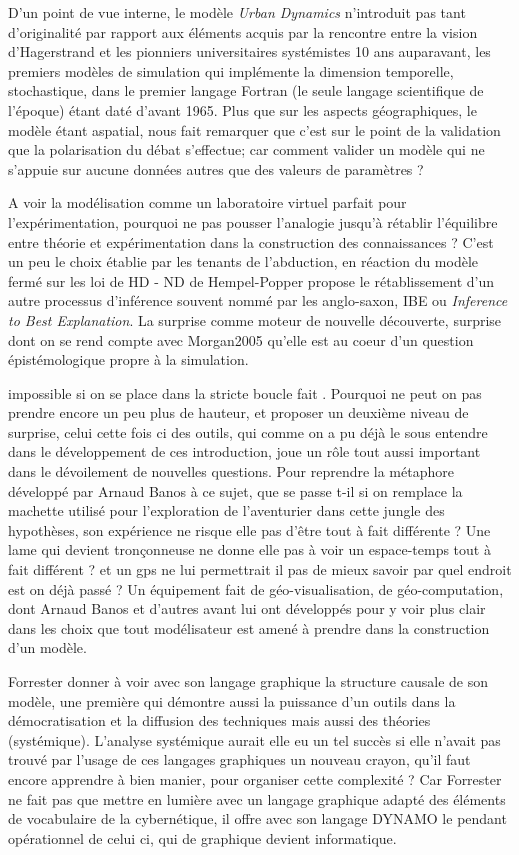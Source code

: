 D'un point de vue interne, le modèle \textit{Urban Dynamics} n'introduit pas tant d'originalité par rapport aux éléments acquis par la rencontre entre la vision d'Hagerstrand et les pionniers universitaires systémistes 10 ans auparavant, les premiers modèles de simulation qui implémente la dimension temporelle, stochastique, dans le premier langage Fortran (le seule langage scientifique de l'époque) étant daté d'avant 1965. Plus que sur les aspects géographiques, le modèle étant aspatial, \autocite{Batty2001} nous fait remarquer que c'est sur le point de la validation que la polarisation du débat s'effectue; car comment valider un modèle qui ne s'appuie sur aucune données autres que des valeurs de paramètres ?

A voir la modélisation comme un laboratoire virtuel parfait pour l'expérimentation, pourquoi ne pas pousser l'analogie jusqu'à rétablir l'équilibre entre théorie et expérimentation dans la construction des connaissances ? C'est un peu le choix établie par les tenants de l'abduction,  en réaction du modèle fermé sur les loi de HD - ND de Hempel-Popper propose le rétablissement d'un autre processus d'inférence souvent nommé par les anglo-saxon, IBE ou \textit{Inference to Best Explanation}. La surprise comme moteur de nouvelle découverte, surprise dont on se rend compte avec Morgan2005 qu'elle est au coeur d'un question épistémologique propre à la simulation.

impossible si on se place dans la stricte boucle fait . Pourquoi ne peut on pas prendre encore un peu plus de hauteur, et proposer un deuxième niveau de surprise, celui cette fois ci des outils, qui comme on a pu déjà le sous entendre dans le développement de ces introduction, joue un rôle tout aussi important dans le dévoilement de nouvelles questions. Pour reprendre la métaphore développé par Arnaud Banos \autocite[22]{Banos2013} à ce sujet, que se passe t-il si on remplace la machette utilisé pour l'exploration de l'aventurier dans cette jungle des hypothèses, son expérience ne risque elle pas d'être tout à fait différente ? Une lame qui devient tronçonneuse ne donne elle pas à voir un espace-temps tout à fait différent ? et un gps ne lui permettrait il pas de mieux savoir par quel endroit est on déjà passé ? Un équipement fait de géo-visualisation, de géo-computation, dont Arnaud Banos et d'autres avant lui ont développés pour y voir plus clair dans les choix que tout modélisateur est amené à prendre dans la construction d'un modèle.

Forrester donner à voir avec son langage graphique la structure causale de son modèle, une première qui démontre aussi la puissance d'un outils dans la démocratisation et la diffusion des techniques mais aussi des théories (systémique). L'analyse systémique aurait elle eu un tel succès si elle n'avait pas trouvé par l'usage de ces langages graphiques un nouveau crayon, qu'il faut encore apprendre à bien manier, pour organiser cette complexité ? Car Forrester ne fait pas que mettre en lumière avec un langage graphique adapté des éléments de vocabulaire de la cybernétique, il offre avec son langage DYNAMO le pendant opérationnel de celui ci, qui de graphique devient informatique. 

